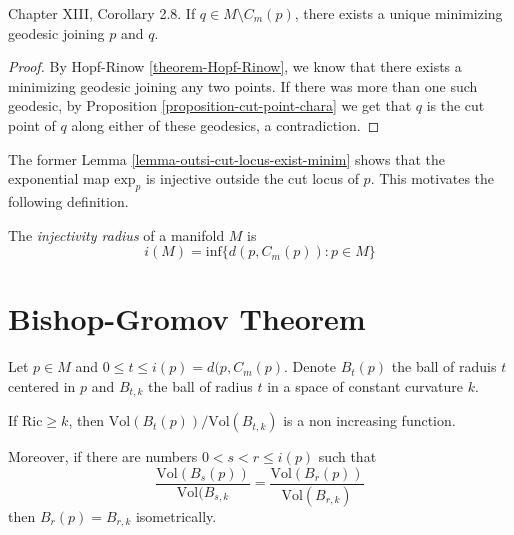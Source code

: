 \documentclass{book}
\begin{document}
\begin{lemma}
\label{lemma-outsi-cut-locus-exist-minim}
\cite{doc} Chapter XIII, Corollary 2.8. If $q
\in M\setminus C_m(p)$, there exists a
 unique minimizing geodesic joining
$p$ and $q$.
\end{lemma}

\begin{proof}
By Hopf-Rinow \ref{theorem-Hopf-Rinow}, we
know that
there exists a minimizing geodesic joining
any two points. If there was more
than one such geodesic, by
Proposition \ref{proposition-cut-point-chara}
we get that $q$ is the cut point of  $q$
along either of these geodesics,
a contradiction.
\end{proof}

The former Lemma
\ref{lemma-outsi-cut-locus-exist-minim}
shows that the exponential map $\text{exp}_p$
 is injective outside the cut locus of $p$.
This motivates the following definition.

\begin{definition}
\label{definition-injectivity-radius}
The {\it injectivity radius} of a manifold
$M$ is
$$
i(M)=\text{inf}\{d(p,C_m(p)):p \in M\}
$$
\end{definition}

\section{Bishop-Gromov Theorem}
\label{section-bishop-gromov}

\begin{theorem}
\label{theorem-Bishop-Gromov}
Let $p \in M$ and $0\leq t \leq
i(p)=d(p,C_m(p)$. Denote $B_t(p)$ the ball of
raduis $t$ centered in $p$ and $B_{t,k}$ the
ball of radius $t$ in a space of
constant curvature $k$.

If $\text{Ric}\geq k$, then
$\text{Vol}(B_t(p))/\text{Vol}(B_{t,k})$ is a
non
increasing function.

Moreover, if there are numbers  $0<s<r\leq
i(p)$ such that
$$
\frac{\text{Vol}(B_s(p))}{\text{Vol}(B_{s,k}}
=
\frac{\text{Vol}(B_r(p))}{\text{Vol}(B_{r,k})
}
$$
then $B_r(p)=B_{r,k}$ isometrically.
\end{theorem}
\end{document}
